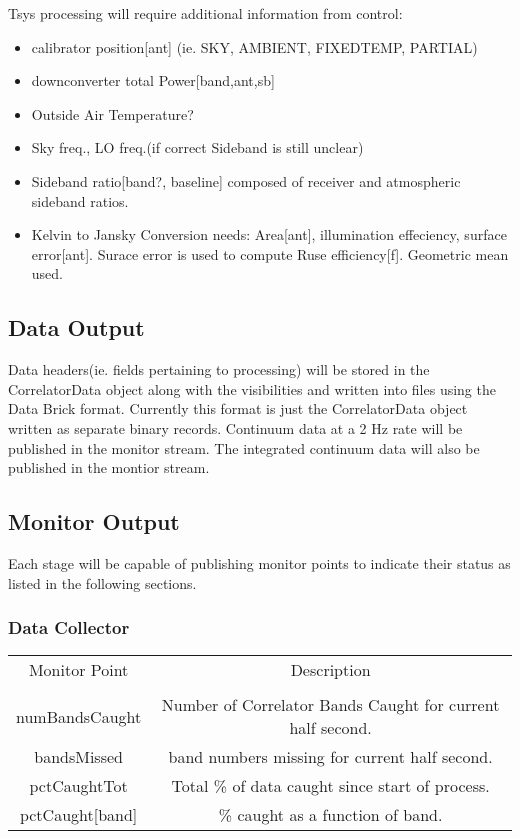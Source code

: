 \documentclass[11pt]{article}
\begin{document}
Tsys processing will require additional information from control:
\begin{itemize}
\item calibrator position[ant] (ie. SKY, AMBIENT, FIXEDTEMP, PARTIAL)
\item downconverter total Power[band,ant,sb]
\item Outside Air Temperature?
\item Sky freq., LO freq.(if correct Sideband is still unclear)
\item Sideband ratio[band?, baseline] composed of receiver
and atmospheric sideband ratios.
\item Kelvin to Jansky Conversion needs: Area[ant], illumination effeciency,
surface error[ant]. Surace error is used to compute Ruse efficiency[f].
Geometric mean used.
\end{itemize}

\subsection{Data Output}
Data headers(ie. fields pertaining to processing) will be stored
in the CorrelatorData  object along with the visibilities and
written into files using the Data Brick format.
Currently this format is just the CorrelatorData object written as
separate binary records.
Continuum data at a 2 Hz rate will be published in the monitor stream.
The integrated continuum data will also be published in the montior stream.

\subsection{Monitor Output}
Each stage will be capable of publishing monitor points to indicate
their status as listed in the following sections.

\subsubsection{Data Collector}
\label{sec:dcmp}
\begin{center}
\begin{tabular}{|c|c|}
\hline
Monitor Point & Description \\
&\\
\hline\hline
numBandsCaught & Number of Correlator Bands Caught for current half second.\\
bandsMissed    & band numbers missing for current half second.\\
pctCaughtTot   & Total \% of data caught since start of process.\\
pctCaught[band]& \% caught as a function of band.\\
\hline
\end{tabular}
\end{center}
\end{document}
